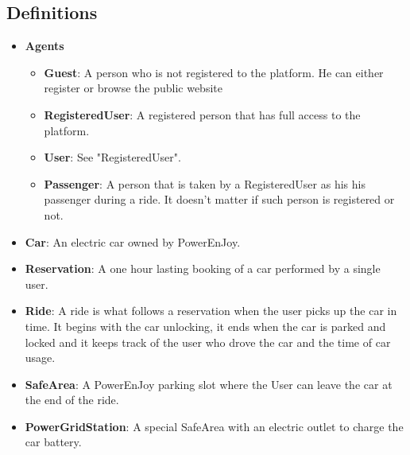 \subsection{Definitions}
    \begin{itemize}
        \item \textbf{Agents}
        \begin{itemize}
            \item \textbf{Guest}: A person who is not registered to the platform. He can either
                register or browse the public website
            \item \textbf{RegisteredUser}: A registered person that has full access to the platform.
            \item \textbf{User}: See "RegisteredUser".
            \item \textbf{Passenger}: A person that is taken by a RegisteredUser as his
                his passenger during a ride. It doesn't matter if such person is registered or not.
        \end{itemize}
        \item \textbf{Car}: An electric car owned by PowerEnJoy.		
        \item \textbf{Reservation}: A one hour lasting booking of a car performed by a 
            single user.
        \item \textbf{Ride}: A ride is what follows a reservation when the user picks up the
            car in time. It begins with the car unlocking, it ends when the car is parked and
            locked and it keeps track of the user who drove the car and the time of car usage.
        \item \textbf{SafeArea}: A PowerEnJoy parking slot where the User can leave the car
            at the end of the ride.
        \item \textbf{PowerGridStation}: A special SafeArea with an electric outlet to charge
            the car battery.
    \end{itemize}
